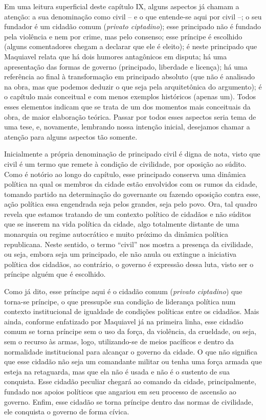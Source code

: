 Em uma leitura superficial deste capítulo IX, alguns aspectos já chamam
a atenção: a sua denominação como civil -- e o que entende-se aqui por
civil --; o seu fundador é um cidadão comum (\emph{privato ciptadino});
esse principado não é fundado pela violência e nem por crime, mas pelo
consenso; esse príncipe é escolhido (alguns comentadores chegam a
declarar que ele é eleito); é neste principado que Maquiavel relata que
há dois humores antagônicos em disputa; há uma apresentação das formas
de governo (principado, liberdade e licença); há uma referência ao final
à transformação em principado absoluto (que não é analisado na obra, mas
que podemos deduzir o que seja pela arquitetônica do argumento); é o
capítulo mais conceitual e com menos exemplos históricos (apenas um).
Todos esses elementos indicam que se trata de um dos momentos mais
conceituais da obra, de maior elaboração teórica. Passar por todos esses
aspectos seria tema de uma tese, e, novamente, lembrando nossa intenção
inicial, desejamos chamar a atenção para alguns aspectos tão somente.

Inicialmente a própria denominação de principado civil é digna de nota,
visto que civil é um termo que remete à condição de civilidade, por
oposição ao súdito. Como é notório ao longo do capítulo, esse principado
conserva uma dinâmica política na qual os membros da cidade estão
envolvidos com os rumos da cidade, tomando partido na determinação do
governante ou fazendo oposição contra esse, ação política essa
engendrada seja pelos grandes, seja pelo povo. Ora, tal quadro revela
que estamos tratando de um contexto político de cidadãos e não súditos
que se inserem na vida política da cidade, algo totalmente distante de
uma monarquia ou regime autocrático e muito próximo da dinâmica política
republicana. Neste sentido, o termo ``civil'' nos mostra a presença da
civilidade, ou seja, embora seja um principado, ele não anula ou
extingue a iniciativa política dos cidadãos, ao contrário, o governo é
expressão dessa luta, visto ser o príncipe alguém que é escolhido.

Como já dito, esse príncipe aqui é o cidadão comum (\emph{privato
ciptadino}) que torna-se príncipe, o que pressupõe sua condição de
liderança política num contexto institucional de igualdade de condições
políticas entre os cidadãos. Mais ainda, conforme enfatizado por
Maquiavel já na primeira linha, esse cidadão comum se torna príncipe sem
o uso da força, da violência, da crueldade, ou seja, sem o recurso às
armas, logo, utilizando-se de meios pacíficos e dentro da normalidade
institucional para alcançar o governo da cidade. O que não significa que
esse cidadão não seja um comandante militar ou tenha uma força armada
que esteja na retaguarda, mas que ela não é usada e não é o sustento de
sua conquista. Esse cidadão peculiar chegará ao comando da cidade,
principalmente, fundado nos apoios políticos que angariou em seu
processo de ascensão ao governo. Enfim, esse cidadão se torna príncipe
dentro das normas de civilidade, ele conquista o governo de forma
cívica.

